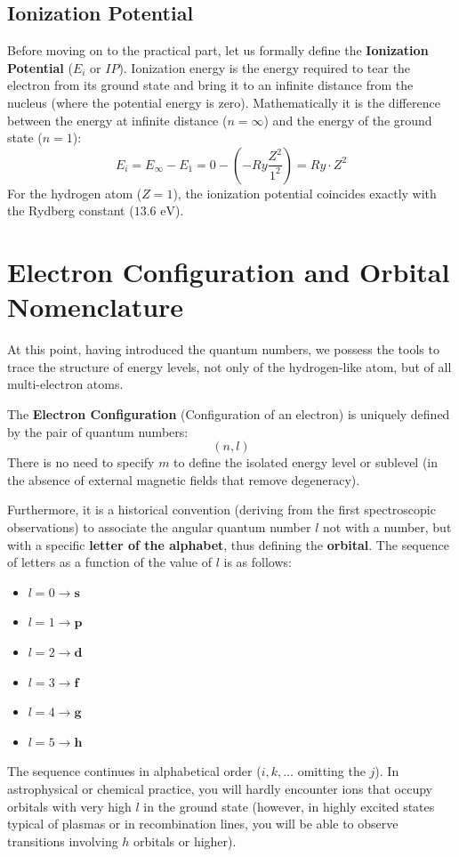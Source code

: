 \subsection{Ionization Potential}

Before moving on to the practical part, let us formally define the \textbf{Ionization Potential} ($E_i$ or $IP$).
Ionization energy is the energy required to tear the electron from its ground state and bring it to an infinite distance from the nucleus (where the potential energy is zero).
Mathematically it is the difference between the energy at infinite distance ($n = \infty$) and the energy of the ground state ($n = 1$):
\begin{equation}
E_i = E_{\infty} - E_1 = 0 - \left( - Ry \frac{Z^2}{1^2} \right) = Ry \cdot Z^2
\end{equation}
For the hydrogen atom ($Z=1$), the ionization potential coincides exactly with the Rydberg constant ($13.6 \text{ eV}$).

\section{Electron Configuration and Orbital Nomenclature}

At this point, having introduced the quantum numbers, we possess the tools to trace the structure of energy levels, not only of the hydrogen-like atom, but of all multi-electron atoms.

The \textbf{Electron Configuration} (Configuration of an electron) is uniquely defined by the pair of quantum numbers:
\begin{equation}
(n, l)
\end{equation}
There is no need to specify $m$ to define the isolated energy level or sublevel (in the absence of external magnetic fields that remove degeneracy).

Furthermore, it is a historical convention (deriving from the first spectroscopic observations) to associate the angular quantum number $l$ not with a number, but with a specific \textbf{letter of the alphabet}, thus defining the \textbf{orbital}.
The sequence of letters as a function of the value of $l$ is as follows:
\begin{itemize}
\item $l = 0 \longrightarrow \textbf{s}$
\item $l = 1 \longrightarrow \textbf{p}$
\item $l = 2 \longrightarrow \textbf{d}$
\item $l = 3 \longrightarrow \textbf{f}$
\item $l = 4 \longrightarrow \textbf{g}$
\item $l = 5 \longrightarrow \textbf{h}$
\end{itemize}
The sequence continues in alphabetical order ($i, k, \ldots$ omitting the $j$).
In astrophysical or chemical practice, you will hardly encounter ions that occupy orbitals with very high $l$ in the ground state (however, in highly excited states typical of plasmas or in recombination lines, you will be able to observe transitions involving $h$ orbitals or higher).

